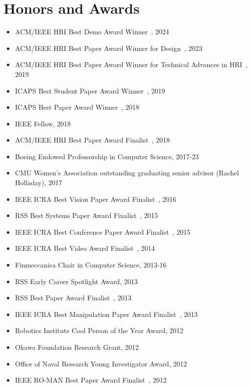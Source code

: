 

\section{Honors and Awards}
\begin{itemize}
\addtolength{\itemsep}{-0.5\baselineskip}
\item ACM/IEEE HRI Best Demo Award Winner~\cite{gordonjenamaninanavati2024demo}, 2024
\item ACM/IEEE HRI Best Paper Award Winner for Design~\cite{nanavati2023designprinciples}, 2023
\item ACM/IEEE HRI Best Paper Award Winner for Technical Advances in HRI~\cite{gallenberger2019skewering}, 2019
\item ICAPS Best Student Paper Award Winner~\cite{mandalika2019gls}, 2019
\item ICAPS Best Paper Award Winner~\cite{haghtalab2018laziness}, 2018
\item IEEE Fellow, 2018
\item ACM/IEEE HRI Best Paper Award Finalist~\cite{chen2018trust}, 2018
\item Boeing Endowed Professorship in Computer Science, 2017-23
\item CMU Women’s Association outstanding graduating senior advisor (Rachel Holladay), 2017
\item IEEE ICRA Best Vision Paper Award Finalist~\cite{klingensmith2016armslamconf}, 2016
\item RSS Best Systems Paper Award Finalist~\cite{klingensmith2015chisel}, 2015
\item IEEE ICRA Best Conference Paper Award Finalist~\cite{dragan2015dmp}, 2015
\item IEEE ICRA Best Video Award Finalist~\cite{chavandafle2014extrinsic}, 2014
\item Finmeccanica Chair in Computer Science, 2013-16
\item RSS Early Career Spotlight Award, 2013
\item RSS Best Paper Award Finalist~\cite{dragan2013legible}, 2013
\item IEEE ICRA Best Manipulation Paper Award Finalist~\cite{javdani2013tactile}, 2013
\item Robotics Institute Cool Person of the Year Award, 2012
\item Okawa Foundation Research Grant, 2012
\item Office of Naval Research Young Investigator Award, 2012
\item IEEE RO-MAN Best Paper Award Finalist~\cite{dragan2012custom}, 2012

\end{itemize}
